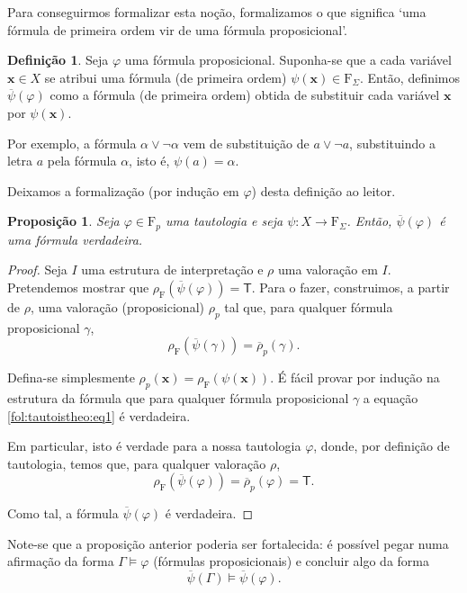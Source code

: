 \documentclass{report}
\newtheorem{prop}{Proposição}
\theoremstyle{definition}
\newtheorem{definicao}{Definição}
\theoremstyle{remark}
\renewcommand{\bf}[1]{\mathbf{#1}}
\newcommand{\F}{\mathrm{F}}
\newcommand{\lt}{\mathsf{T}}
\begin{document}
	Para conseguirmos formalizar esta noção, formalizamos o que significa `uma fórmula de primeira ordem vir de uma fórmula proposicional'.
	
	\begin{definicao}
	Seja $\varphi$ uma fórmula proposicional. Suponha-se que a cada variável $\bf x \in X$ se atribui uma fórmula (de primeira ordem) $\psi(\bf x) \in \F_\Sigma$. Então, definimos $\overline\psi(\varphi)$ como a fórmula (de primeira ordem) obtida de substituir cada variável $\bf x$ por $\psi(\bf x)$.
	
	Por exemplo, a fórmula $\alpha \lor \neg \alpha$ vem de substituição de $a \lor \neg a$, substituindo a letra $a$ pela fórmula $\alpha$, isto é, $\psi(a) = \alpha$.
	
	Deixamos a formalização (por indução em $\varphi$) desta definição ao leitor.
	\end{definicao}
	
	\begin{prop}\label{fol:tautoistheo}
	Seja $\varphi \in \F_p$ uma tautologia e seja $\psi : X \to \F_\Sigma$. Então, $\overline\psi(\varphi)$ é uma fórmula verdadeira.
	\end{prop}
	
	\begin{proof}
	Seja $I$ uma estrutura de interpretação e $\rho$ uma valoração em $I$. Pretendemos mostrar que $\rho_\F(\overline\psi(\varphi)) = \lt$. Para o fazer, construimos, a partir de $\rho$, uma valoração (proposicional) $\rho_p$ tal que, para qualquer fórmula proposicional $\gamma$,
	\begin{equation}\label{fol:tautoistheo:eq1}
	\rho_\F(\overline\psi(\gamma)) = \overline \rho_p (\gamma).
	\end{equation}
	
	Defina-se simplesmente $\rho_p(\bf x) = \rho_\F(\psi(\bf x))$. É fácil provar por indução na estrutura da fórmula que para qualquer fórmula proposicional $\gamma$ a equação \eqref{fol:tautoistheo:eq1} é verdadeira.
	
	Em particular, isto é verdade para a nossa tautologia $\varphi$, donde, por definição de tautologia, temos que, para qualquer valoração $\rho$,
	\[\rho_\F(\overline\psi(\varphi)) = \overline \rho_p (\varphi) = \lt.\]
	
	Como tal, a fórmula $\overline\psi(\varphi)$ é verdadeira.
	\end{proof}
	
	Note-se que a proposição anterior poderia ser fortalecida: é possível pegar numa afirmação da forma $\Gamma \vDash \varphi$ (fórmulas proposicionais) e concluir algo da forma
	\begin{equation}\label{fol:tautoistheo:eq2}
	\overline\psi(\Gamma) \vDash \overline\psi(\varphi).
	\end{equation}
	
\end{document}
